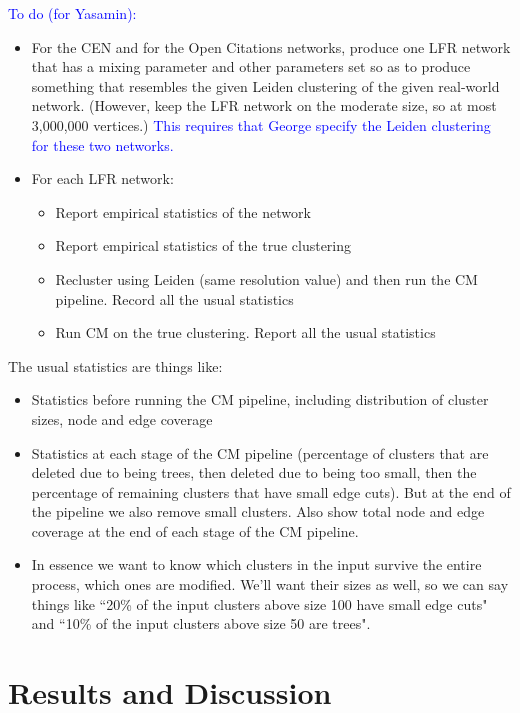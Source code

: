\documentclass[12pt, oneside]{article}   	%
\begin{document}
\textcolor{blue}{
To do (for Yasamin):}

\begin{itemize}
\item For  the CEN and  for the Open Citations networks, produce one LFR network  that has a mixing parameter and other
parameters set so as to produce something that resembles the given Leiden clustering of the given real-world network. (However, keep the LFR network
on the moderate size, so at most 3,000,000 vertices.) 
\textcolor{blue}{This requires that George specify the Leiden clustering for these two networks.}
\item 
For each LFR network: 
\begin{itemize}
\item Report empirical statistics of the network
\item Report empirical statistics of the true clustering 
\item 
Recluster using Leiden (same resolution value) and then run the CM pipeline.
Record all the usual statistics
\item Run CM on the true clustering.
Report all the usual statistics
\end{itemize}
\end{itemize}

\noindent
The usual statistics are things like:
\begin{itemize}
\item Statistics before running the CM pipeline, including distribution of cluster sizes, node and edge coverage 
\item Statistics at each stage of the CM pipeline (percentage of clusters that are deleted due to being trees,
then deleted due to being too small, then the percentage of remaining clusters  that have small edge cuts).
But at the end of the pipeline we also remove small clusters.  
Also show total node and edge coverage at the end of each stage of the CM pipeline. 
\item 
In essence we want to know which clusters in the input survive the entire process, which ones are modified. 
We'll want their sizes as well, so we can say things like ``20\% of the input clusters above size 100 have small edge cuts" and
``10\% of the input clusters above size 50 are trees".
\end{itemize}

\section{Results and Discussion}
\end{document}
